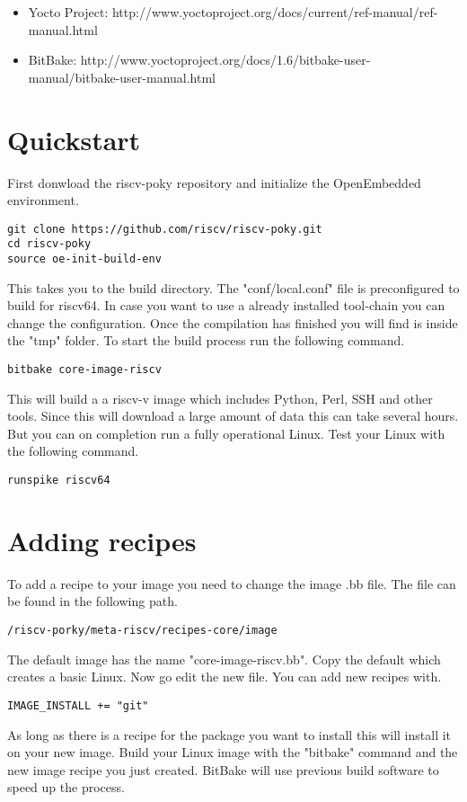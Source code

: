 \begin{itemize}
\item Yocto Project: http://www.yoctoproject.org/docs/current/ref-manual/ref-manual.html
\item BitBake: http://www.yoctoproject.org/docs/1.6/bitbake-user-manual/bitbake-user-manual.html
\end{itemize}

\section{Quickstart}

First donwload the riscv-poky repository and initialize the OpenEmbedded environment.

\begin{verbatim}
git clone https://github.com/riscv/riscv-poky.git
cd riscv-poky
source oe-init-build-env
\end{verbatim}

This takes you to the build directory. The "conf/local.conf" file is preconfigured to build for riscv64. 
In case you want to use a already installed tool-chain you can change the configuration. Once the
compilation has finished you will find is inside the "tmp" folder. To start the build process run 
the following command.

\begin{verbatim}
bitbake core-image-riscv
\end{verbatim}
This will build a a riscv-v image which includes Python, Perl, SSH and other tools. Since this will
download a large amount of data this can take several hours. But you can on completion run a fully
operational Linux. Test your Linux with the following command.

\begin{verbatim}
runspike riscv64
\end{verbatim}

\section{Adding recipes}
To add a recipe to your image you need to change the image .bb file. The file can be found in the following 
path.

\begin{verbatim}
/riscv-porky/meta-riscv/recipes-core/image
\end{verbatim}
The default image has the name "core-image-riscv.bb". Copy the default which creates a basic Linux.
Now go edit the new file. You can add new recipes with.
\begin{verbatim}
IMAGE_INSTALL += "git"
\end{verbatim}
As long as there is a recipe for the package you want to install this will install it on your new image.
Build your Linux image with the "bitbake" command and the new image recipe you just created. BitBake will use
previous build software to speed up the process.

